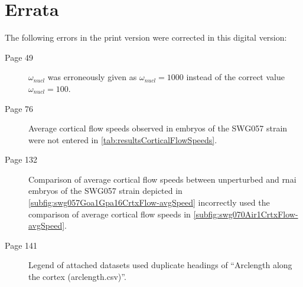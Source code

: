 \section*{Errata}
The following errors in the print version were corrected in this digital version:
\begin{description}
    \item[Page 49] $\omega_{nucl}$ was erroneously given as $\omega_{nucl} = 1000$ instead of the correct value $\omega_{nucl} = 100$.
    \item[Page 76] Average cortical flow speeds observed in embryos of the SWG057 strain were not entered in  \autoref{tab:resultsCorticalFlowSpeeds}.
    \item[Page 132] Comparison of average cortical flow speeds between unperturbed and  \ac{rnai} embryos of the SWG057 strain depicted in \autoref{subfig:swg057Goa1Gpa16CrtxFlow-avgSpeed} incorrectly used the comparison of average cortical flow speeds in \autoref{subfig:swg070Air1CrtxFlow-avgSpeed}.
    \item[Page 141] Legend of attached datasets used duplicate headings of \enquote{Arclength along the cortex (arclength.csv)}.
\end{description}
    